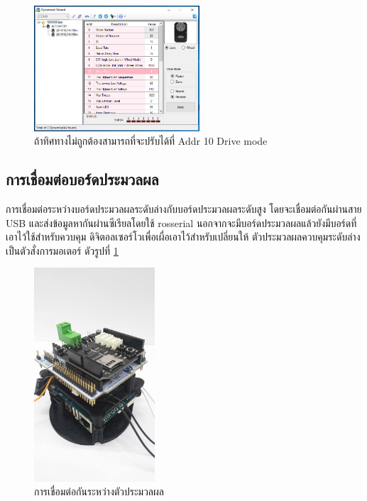 \begin{figure}[!ht]
    \centering
    \includegraphics[width=0.55\textwidth]{chapter3/images/roboplus/roboplus7.PNG}
    \caption*{ถ้าทิศทางไม่ถูกต้องสามารถที่จะปรับได้ที่ Addr 10 Drive mode}
\end{figure}

\clearpage
\subsection{การเชื่อมต่อบอร์ดประมวลผล}
การเชื่อมต่อระหว่างบอร์ดประมวลผลระดับล่างกับบอร์ดประมวลผลระดับสูง โดยจะเชื่อมต่อกันผ่านสาย USB
และส่งข้อมูลหากันผ่านซีเรียลโดยใช้ rosserial นอกจากจะมีบอร์ดประมวลผลแล้วยังมีบอร์ดที่เอาไว้ใช้สำหรับควบคุม
ดิจิตอลเซอร์โวเพื่อเผื่อเอาไว้สำหรับเปลี่ยนให้ ตัวประมวลผลควบคุมระดับล่างเป็นตัวสั่งการมอเตอร์
ดัวรูปที่ \ref{fig:uthai_controller}

\begin{figure}[!ht]
    \centering
    \includegraphics[width=0.4\textwidth]{chapter3/images/uthai_controller.jpg}
    \caption{การเชื่อมต่อกันระหว่างตัวประมวลผล}
    \label{fig:uthai_controller}
\end{figure}




